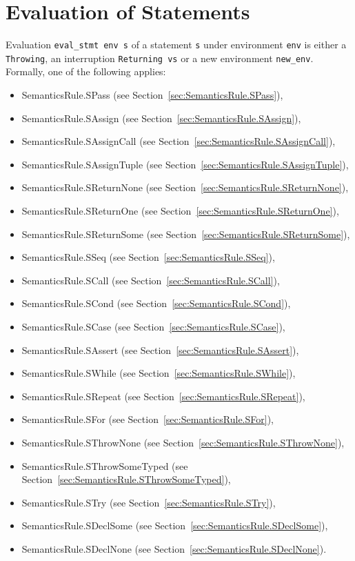 \documentclass{book}
\begin{document}

\chapter{Evaluation of Statements \label{chap:eval_stmt}}
Evaluation \texttt{eval\_stmt env s} of a statement \texttt{s} under
environment \texttt{env} is either a \texttt{Throwing}, an interruption
\texttt{Returning vs} or a new environment \texttt{new\_env}. Formally, one of
the following applies:
\begin{itemize}
\item SemanticsRule.SPass (see Section~\ref{sec:SemanticsRule.SPass}), 
\item SemanticsRule.SAssign (see Section~\ref{sec:SemanticsRule.SAssign}), 
\item SemanticsRule.SAssignCall (see Section~\ref{sec:SemanticsRule.SAssignCall}), 
\item SemanticsRule.SAssignTuple (see Section~\ref{sec:SemanticsRule.SAssignTuple}), 
\item SemanticsRule.SReturnNone (see Section~\ref{sec:SemanticsRule.SReturnNone}), 
\item SemanticsRule.SReturnOne (see Section~\ref{sec:SemanticsRule.SReturnOne}), 
\item SemanticsRule.SReturnSome (see Section~\ref{sec:SemanticsRule.SReturnSome}), 
\item SemanticsRule.SSeq (see Section~\ref{sec:SemanticsRule.SSeq}), 
\item SemanticsRule.SCall (see Section~\ref{sec:SemanticsRule.SCall}), 
\item SemanticsRule.SCond (see Section~\ref{sec:SemanticsRule.SCond}), 
\item SemanticsRule.SCase (see Section~\ref{sec:SemanticsRule.SCase}), 
\item SemanticsRule.SAssert (see Section~\ref{sec:SemanticsRule.SAssert}), 
\item SemanticsRule.SWhile (see Section~\ref{sec:SemanticsRule.SWhile}), 
\item SemanticsRule.SRepeat (see Section~\ref{sec:SemanticsRule.SRepeat}), 
\item SemanticsRule.SFor (see Section~\ref{sec:SemanticsRule.SFor}), 
\item SemanticsRule.SThrowNone (see Section~\ref{sec:SemanticsRule.SThrowNone}), 
\item SemanticsRule.SThrowSomeTyped (see Section~\ref{sec:SemanticsRule.SThrowSomeTyped}), 
\item SemanticsRule.STry (see Section~\ref{sec:SemanticsRule.STry}), 
\item SemanticsRule.SDeclSome (see Section~\ref{sec:SemanticsRule.SDeclSome}), 
\item SemanticsRule.SDeclNone (see Section~\ref{sec:SemanticsRule.SDeclNone}). 
\end{itemize}
\end{document}
